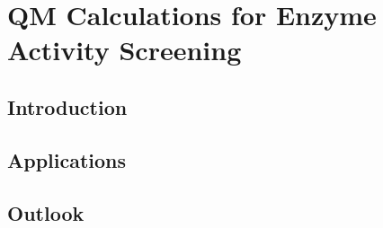 \chapter[QM Calculations for Enzyme Activity Screening]
{QM Calculations for Enzyme Activity Screening\label{ch1}}




\section{Introduction}\label{sec:intro}

\section{Applications}\label{sec:apps}

\section{Outlook}\label{sec:out}
